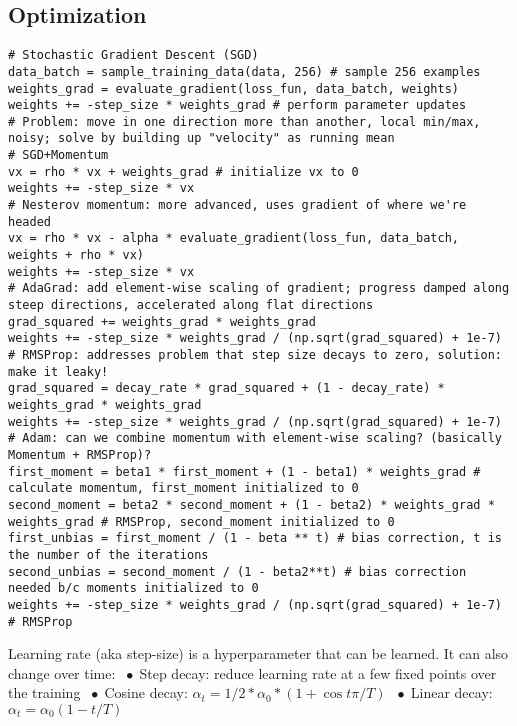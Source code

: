 \documentclass[9pt]{extarticle}
\newcommand*\bspace{$\; \bullet \;$}
\begin{document}
\subsection{Optimization}
\begin{lstlisting}
# Stochastic Gradient Descent (SGD)
data_batch = sample_training_data(data, 256) # sample 256 examples
weights_grad = evaluate_gradient(loss_fun, data_batch, weights)
weights += -step_size * weights_grad # perform parameter updates
# Problem: move in one direction more than another, local min/max, noisy; solve by building up "velocity" as running mean
# SGD+Momentum
vx = rho * vx + weights_grad # initialize vx to 0
weights += -step_size * vx
# Nesterov momentum: more advanced, uses gradient of where we're headed
vx = rho * vx - alpha * evaluate_gradient(loss_fun, data_batch, weights + rho * vx)
weights += -step_size * vx
# AdaGrad: add element-wise scaling of gradient; progress damped along steep directions, accelerated along flat directions
grad_squared += weights_grad * weights_grad
weights += -step_size * weights_grad / (np.sqrt(grad_squared) + 1e-7)
# RMSProp: addresses problem that step size decays to zero, solution: make it leaky!
grad_squared = decay_rate * grad_squared + (1 - decay_rate) * weights_grad * weights_grad
weights += -step_size * weights_grad / (np.sqrt(grad_squared) + 1e-7)
# Adam: can we combine momentum with element-wise scaling? (basically Momentum + RMSProp)?
first_moment = beta1 * first_moment + (1 - beta1) * weights_grad # calculate momentum, first_moment initialized to 0
second_moment = beta2 * second_moment + (1 - beta2) * weights_grad * weights_grad # RMSProp, second_moment initialized to 0
first_unbias = first_moment / (1 - beta ** t) # bias correction, t is the number of the iterations
second_unbias = second_moment / (1 - beta2**t) # bias correction needed b/c moments initialized to 0
weights += -step_size * weights_grad / (np.sqrt(grad_squared) + 1e-7) # RMSProp
\end{lstlisting}
Learning rate (aka step-size) is a hyperparameter that can be learned. It can also change over time: \bspace Step decay: reduce learning rate at a few fixed points over the training \bspace Cosine decay: $\alpha_t = 1/2 * \alpha_0 * (1 + \cos{t\pi / T})$ \bspace Linear decay: $\alpha_t = \alpha_0(1 - t/T)$
\end{document}
